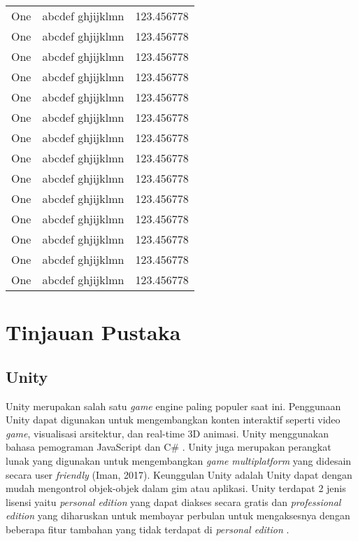 \begin{landscape}
\begin{center}
\begin{longtable}{|l|l|l|}
		One & abcdef ghjijklmn & 123.456778 \\
		One & abcdef ghjijklmn & 123.456778 \\
		One & abcdef ghjijklmn & 123.456778 \\
		One & abcdef ghjijklmn & 123.456778 \\
		One & abcdef ghjijklmn & 123.456778 \\
		One & abcdef ghjijklmn & 123.456778 \\
		One & abcdef ghjijklmn & 123.456778 \\
		One & abcdef ghjijklmn & 123.456778 \\
		One & abcdef ghjijklmn & 123.456778 \\
		One & abcdef ghjijklmn & 123.456778 \\
		One & abcdef ghjijklmn & 123.456778 \\
		One & abcdef ghjijklmn & 123.456778 \\
		One & abcdef ghjijklmn & 123.456778 \\
		One & abcdef ghjijklmn & 123.456778 \\
		\end{longtable}
		\end{center}
	\end{landscape}

\section{Tinjauan Pustaka}
\subsection{Unity}
\noindent

Unity merupakan salah satu \textit{game} engine paling populer saat ini. Penggunaan Unity dapat digunakan untuk mengembangkan konten interaktif seperti video \textit{game}, 
visualisasi arsitektur, dan real-time 3D animasi. Unity menggunakan bahasa pemograman JavaScript dan 
C\# \cite{Ansori}. Unity juga merupakan perangkat lunak yang digunakan untuk mengembangkan \textit{game} \textit{multiplatform} yang didesain secara user \textit{friendly} 
(Iman, 2017). Keunggulan Unity adalah Unity 
dapat dengan mudah mengontrol objek-objek 
dalam gim atau aplikasi. Unity terdapat 2 jenis 
lisensi yaitu \textit{personal edition} yang dapat diakses 
secara gratis dan \textit{professional edition} yang 
diharuskan untuk membayar perbulan untuk 
mengaksesnya dengan beberapa fitur tambahan 
yang tidak terdapat di \textit{personal edition} \cite{Sarwodi}. 

